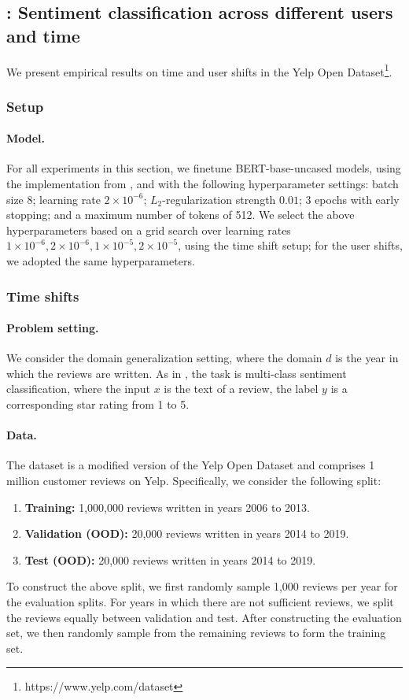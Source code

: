 \subsection{\Yelp: Sentiment classification across different users and time}\label{sec:app_yelp}
We present empirical results on time and user shifts in the Yelp Open Dataset\footnote{https://www.yelp.com/dataset}.

\subsubsection{Setup}
\paragraph{Model.}
For all experiments in this section, we finetune BERT-base-uncased models, using the implementation from \citet{wolf2019transformers}, and with the following hyperparameter settings:
batch size 8; learning rate $2 \times 10^{-6}$; $L_2$-regularization strength $0.01$; 3 epochs with early stopping; and a maximum number of tokens of 512.
We select the above hyperparameters based on a grid search over learning rates $1 \times 10^{-6}, 2 \times 10^{-6}, 1 \times 10^{-5}, 2 \times 10^{-5}$, using the time shift setup; for the user shifts, we adopted the same hyperparameters.

\subsubsection{Time shifts}
\paragraph{Problem setting.}
We consider the domain generalization setting, where the domain $d$ is the year in which the reviews are written.
As in \Amazon, the task is multi-class sentiment classification, where
the input $x$ is the text of a review, the label $y$ is a corresponding star rating from 1 to 5.

\paragraph{Data.}
The dataset is a modified version of the Yelp Open Dataset and comprises 1 million customer reviews on Yelp.
Specifically, we consider the following split:
\begin{enumerate}
  \item \textbf{Training:} 1,000,000 reviews written in years 2006 to 2013.
  \item \textbf{Validation (OOD):} 20,000 reviews written in years 2014 to 2019.
  \item \textbf{Test (OOD):} 20,000 reviews written in years 2014 to 2019.
\end{enumerate}
To construct the above split, we first randomly sample 1,000 reviews per year for the evaluation splits. For years in which there are not sufficient reviews, we split the reviews equally between validation and test. After constructing the evaluation set, we then randomly sample from the remaining reviews to form the training set.

